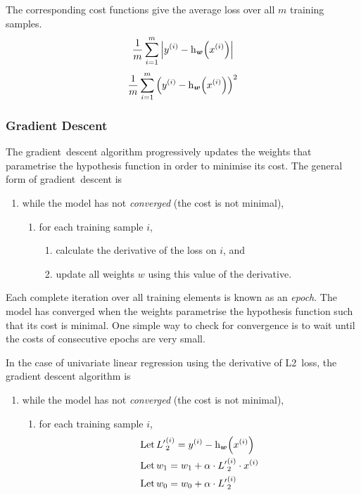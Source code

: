 The corresponding cost functions give the average loss over all \( m \) training samples.
\begin{equation*}
  \frac{1}{m} \sum_{i=1}^{m} \left\lvert y^{(i)} - \function[_{\boldsymbol{w}}]{h}{x^{(i)}} \right\rvert
\end{equation*}
\begin{equation*}
  \frac{1}{m} \sum_{i=1}^{m} \left( y^{(i)} - \function[_{\boldsymbol{w}}]{h}{x^{(i)}} \right)^{2}
\end{equation*}

\subsubsection{Gradient Descent}

The gradient~descent algorithm progressively updates the weights that parametrise the hypothesis function in order to minimise its cost.
The general form of gradient~descent is
\begin{enumerate}
  \item while the model has not \emph{converged} (the cost is not minimal),
  \begin{enumerate}
    \item for each training sample \( i \),
    \begin{enumerate}
      \item calculate the derivative of the loss on \( i \), and
      \item update all weights \( w \) using this value of the derivative.
    \end{enumerate}
  \end{enumerate}
\end{enumerate}

Each complete iteration over all training elements is known as an \emph{epoch}.
The model has converged when the weights parametrise the hypothesis function such that its cost is minimal.
One simple way to check for convergence is to wait until the costs of consecutive epochs are very small.

In the case of univariate linear regression using the derivative of L2~loss, the gradient descent algorithm is
\begin{enumerate}
  \item while the model has not \emph{converged} (the cost is not minimal),
  \begin{enumerate}
    \item for each training sample \( i \),
    \begin{align*}
      \text{Let}\, &{L^{\prime}}_{2}^{(i)} = y^{(i)} - \function[_{\boldsymbol{w}}]{h}{x^{(i)}} \\
      \text{Let}\, &w_{1} = w_{1} + \alpha \cdot {L^{\prime}}_{2}^{(i)} \cdot x^{(i)} \\
      \text{Let}\, &w_{0} = w_{0} + \alpha \cdot {L^{\prime}}_{2}^{(i)}
    \end{align*}
  \end{enumerate}
\end{enumerate}


